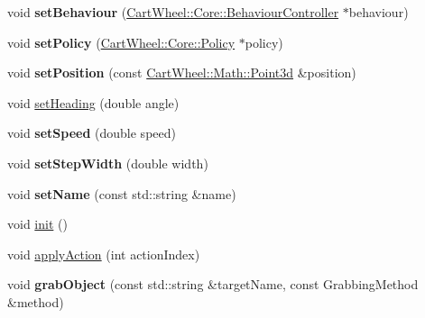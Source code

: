 \begin{DoxyCompactItemize}
\item 
\hypertarget{classCartWheel_1_1Core_1_1Human_a76df73e2afb3d1f49213448878d9dbf5}{
void {\bfseries setBehaviour} (\hyperlink{classCartWheel_1_1Core_1_1BehaviourController}{CartWheel::Core::BehaviourController} $\ast$behaviour)}
\label{classCartWheel_1_1Core_1_1Human_a76df73e2afb3d1f49213448878d9dbf5}

\item 
\hypertarget{classCartWheel_1_1Core_1_1Human_abd9c16cd8c4f2c3fd3fb24c6e6afdbe5}{
void {\bfseries setPolicy} (\hyperlink{classCartWheel_1_1Core_1_1Policy}{CartWheel::Core::Policy} $\ast$policy)}
\label{classCartWheel_1_1Core_1_1Human_abd9c16cd8c4f2c3fd3fb24c6e6afdbe5}

\item 
\hypertarget{classCartWheel_1_1Core_1_1Human_acbfcfac3c91f01daa2328ddfc062c08d}{
void {\bfseries setPosition} (const \hyperlink{classCartWheel_1_1Math_1_1Point3d}{CartWheel::Math::Point3d} \&position)}
\label{classCartWheel_1_1Core_1_1Human_acbfcfac3c91f01daa2328ddfc062c08d}

\item 
void \hyperlink{classCartWheel_1_1Core_1_1Human_a3b99b7ad3f4e6a211093f21250a5b5bf}{setHeading} (double angle)
\item 
\hypertarget{classCartWheel_1_1Core_1_1Human_a63ec6e9388f921bb52fbd7be5b938a9d}{
void {\bfseries setSpeed} (double speed)}
\label{classCartWheel_1_1Core_1_1Human_a63ec6e9388f921bb52fbd7be5b938a9d}

\item 
\hypertarget{classCartWheel_1_1Core_1_1Human_a0218eabcbd12db599cd6c2d4a9a043e8}{
void {\bfseries setStepWidth} (double width)}
\label{classCartWheel_1_1Core_1_1Human_a0218eabcbd12db599cd6c2d4a9a043e8}

\item 
\hypertarget{classCartWheel_1_1Core_1_1Human_a901d8aff5d760b19c7d64403ae4d392f}{
void {\bfseries setName} (const std::string \&name)}
\label{classCartWheel_1_1Core_1_1Human_a901d8aff5d760b19c7d64403ae4d392f}

\item 
void \hyperlink{classCartWheel_1_1Core_1_1Human_a67285fc71a5c3f07a24a268e796bb3f2}{init} ()
\item 
void \hyperlink{classCartWheel_1_1Core_1_1Human_a96af09af6db72efc7fe1582f1721980c}{applyAction} (int actionIndex)
\item 
\hypertarget{classCartWheel_1_1Core_1_1Human_a15ea269918138a8eb0895bb15deac3a5}{
void {\bfseries grabObject} (const std::string \&targetName, const GrabbingMethod \&method)}
\label{classCartWheel_1_1Core_1_1Human_a15ea269918138a8eb0895bb15deac3a5}


\end{DoxyCompactItemize}
